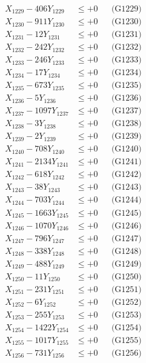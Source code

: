 \documentclass[a4paper,10pt]{article}
\begin{document}
{\begin{align}
X_{1229} - 406Y_{1229} &\leq +0 && \text{(G1229)} \\
X_{1230} - 911Y_{1230} &\leq +0 && \text{(G1230)} \\
\allowbreak
X_{1231} - 12Y_{1231} &\leq +0 && \text{(G1231)} \\
X_{1232} - 242Y_{1232} &\leq +0 && \text{(G1232)} \\
X_{1233} - 246Y_{1233} &\leq +0 && \text{(G1233)} \\
X_{1234} - 17Y_{1234} &\leq +0 && \text{(G1234)} \\
X_{1235} - 673Y_{1235} &\leq +0 && \text{(G1235)} \\
X_{1236} - 5Y_{1236} &\leq +0 && \text{(G1236)} \\
X_{1237} - 1097Y_{1237} &\leq +0 && \text{(G1237)} \\
X_{1238} - 3Y_{1238} &\leq +0 && \text{(G1238)} \\
X_{1239} - 2Y_{1239} &\leq +0 && \text{(G1239)} \\
X_{1240} - 708Y_{1240} &\leq +0 && \text{(G1240)} \\
\allowbreak
X_{1241} - 2134Y_{1241} &\leq +0 && \text{(G1241)} \\
X_{1242} - 618Y_{1242} &\leq +0 && \text{(G1242)} \\
X_{1243} - 38Y_{1243} &\leq +0 && \text{(G1243)} \\
X_{1244} - 703Y_{1244} &\leq +0 && \text{(G1244)} \\
X_{1245} - 1663Y_{1245} &\leq +0 && \text{(G1245)} \\
X_{1246} - 1070Y_{1246} &\leq +0 && \text{(G1246)} \\
X_{1247} - 796Y_{1247} &\leq +0 && \text{(G1247)} \\
X_{1248} - 338Y_{1248} &\leq +0 && \text{(G1248)} \\
X_{1249} - 488Y_{1249} &\leq +0 && \text{(G1249)} \\
X_{1250} - 11Y_{1250} &\leq +0 && \text{(G1250)} \\
\allowbreak
X_{1251} - 231Y_{1251} &\leq +0 && \text{(G1251)} \\
X_{1252} - 6Y_{1252} &\leq +0 && \text{(G1252)} \\
X_{1253} - 255Y_{1253} &\leq +0 && \text{(G1253)} \\
X_{1254} - 1422Y_{1254} &\leq +0 && \text{(G1254)} \\
X_{1255} - 1017Y_{1255} &\leq +0 && \text{(G1255)} \\
X_{1256} - 731Y_{1256} &\leq +0 && \text{(G1256)} \\

\end{align}}
\end{document}
